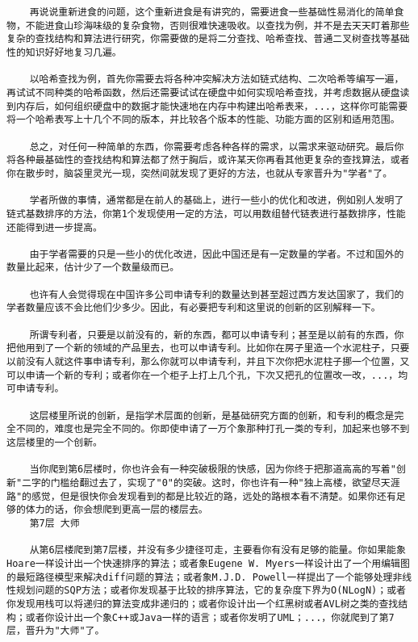 \begin{verbatim}
    再说说重新进食的问题，这个重新进食是有讲究的，需要进食一些基础性易消化的简单食物，不能进食山珍海味级的复杂食物，否则很难快速吸收。以查找为例，并不是去天天盯着那些复杂的查找结构和算法进行研究，你需要做的是将二分查找、哈希查找、普通二叉树查找等基础性的知识好好地复习几遍。

    以哈希查找为例，首先你需要去将各种冲突解决方法如链式结构、二次哈希等编写一遍，再试试不同种类的哈希函数，然后还需要试试在硬盘中如何实现哈希查找，并考虑数据从硬盘读到内存后，如何组织硬盘中的数据才能快速地在内存中构建出哈希表来，...，这样你可能需要将一个哈希表写上十几个不同的版本，并比较各个版本的性能、功能方面的区别和适用范围。

    总之，对任何一种简单的东西，你需要考虑各种各样的需求，以需求来驱动研究。最后你将各种最基础性的查找结构和算法都了然于胸后，或许某天你再看其他更复杂的查找算法，或者你在散步时，脑袋里灵光一现，突然间就发现了更好的方法，也就从专家晋升为"学者"了。

    学者所做的事情，通常都是在前人的基础上，进行一些小的优化和改进，例如别人发明了链式基数排序的方法，你第1个发现使用一定的方法，可以用数组替代链表进行基数排序，性能还能得到进一步提高。

    由于学者需要的只是一些小的优化改进，因此中国还是有一定数量的学者。不过和国外的数量比起来，估计少了一个数量级而已。

    也许有人会觉得现在中国许多公司申请专利的数量达到甚至超过西方发达国家了，我们的学者数量应该不会比他们少多少。因此，有必要把专利和这里说的创新的区别解释一下。

    所谓专利者，只要是以前没有的，新的东西，都可以申请专利；甚至是以前有的东西，你把他用到了一个新的领域的产品里去，也可以申请专利。比如你在房子里造一个水泥柱子，只要以前没有人就这件事申请专利，那么你就可以申请专利，并且下次你把水泥柱子挪一个位置，又可以申请一个新的专利；或者你在一个柜子上打上几个孔，下次又把孔的位置改一改，...，均可申请专利。

    这层楼里所说的创新，是指学术层面的创新，是基础研究方面的创新，和专利的概念是完全不同的，难度也是完全不同的。你即使申请了一万个象那种打孔一类的专利，加起来也够不到这层楼里的一个创新。

    当你爬到第6层楼时，你也许会有一种突破极限的快感，因为你终于把那道高高的写着"创新"二字的门槛给翻过去了，实现了"0"的突破。这时，你也许有一种"独上高楼，欲望尽天涯路"的感觉，但是很快你会发现看到的都是比较近的路，远处的路根本看不清楚。如果你还有足够的体力的话，你会想爬到更高一层的楼层去。
    第7层 大师

    从第6层楼爬到第7层楼，并没有多少捷径可走，主要看你有没有足够的能量。你如果能象Hoare一样设计出一个快速排序的算法；或者象Eugene W. Myers一样设计出了一个用编辑图的最短路径模型来解决diff问题的算法；或者象M.J.D. Powell一样提出了一个能够处理非线性规划问题的SQP方法；或者你发现基于比较的排序算法，它的复杂度下界为O(NLogN)；或者你发现用栈可以将递归的算法变成非递归的；或者你设计出一个红黑树或者AVL树之类的查找结构；或者你设计出一个象C++或Java一样的语言；或者你发明了UML；...，你就爬到了第7层，晋升为"大师"了。


\end{verbatim}
